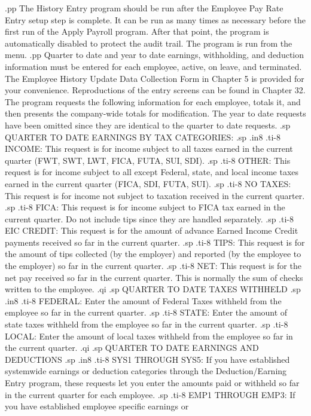 .pp
The History Entry program should be run after the Employee Pay
Rate Entry setup step is complete.  It can be run as many times as
necessary before the first run of the Apply Payroll program.  After
that point, the program is automatically disabled to protect the
audit trail.  The program is run from the menu.
.pp
Quarter to date and year to date earnings, withholding, and deduction
information must be entered for each employee, active, on leave, and
terminated.  The Employee History Update Data Collection Form
in Chapter 5 is provided for your convenience.	Reproductions of the
entry screens can be found in Chapter 32.  The program requests the
following information for each employee, totals it, and then presents
the company-wide totals for modification.  The year to date requests
have been omitted since they
are identical to the quarter to date requests.
.sp
QUARTER TO DATE EARNINGS BY TAX CATEGORIES:
.sp
.in8
.ti-8
INCOME: This request is for income
subject to all taxes earned
in the current quarter (FWT, SWT, LWT, FICA, FUTA, SUI, SDI).
.sp
.ti-8
OTHER:	This request is for income subject to all except Federal, state, and
local income taxes
earned in the current quarter (FICA, SDI, FUTA, SUI).
.sp
.ti-8
NO TAXES: This request is for income not subject to taxation received
in the current quarter.
.sp
.ti-8
FICA:	This request is for income subject to FICA tax earned in the
current quarter. Do not include tips since they are handled separately.
.sp
.ti-8
EIC CREDIT: This request is for the amount of advance Earned Income
Credit payments received so far in the current quarter.
.sp
.ti-8
TIPS:	This request is for the amount of tips collected (by the employer)
and reported (by the employee to the employer) so far in the current quarter.
.sp
.ti-8
NET:	This request is for the net pay received so far in the current
quarter.  This is normally the sum of checks written to the employee.
.qi
.sp
QUARTER TO DATE TAXES WITHHELD
.sp
.in8
.ti-8
FEDERAL: Enter the amount of Federal Taxes withheld from the employee
so far in the current quarter.
.sp
.ti-8
STATE:	Enter the amount of state taxes withheld from the employee so far
in the current quarter.
.sp
.ti-8
LOCAL:	Enter the amount of local taxes withheld from the employee so far
in the current quarter.
.qi
.sp
QUARTER TO DATE EARNINGS AND DEDUCTIONS
.sp
.in8
.ti-8
SYS1 THROUGH SYS5: If you have established systemwide earnings or deduction
categories through the Deduction/Earning Entry program, these requests
let you enter the amounts paid or withheld so far in the current quarter
for each employee.
.sp
.ti-8
EMP1 THROUGH EMP3: If you have established employee specific earnings or
